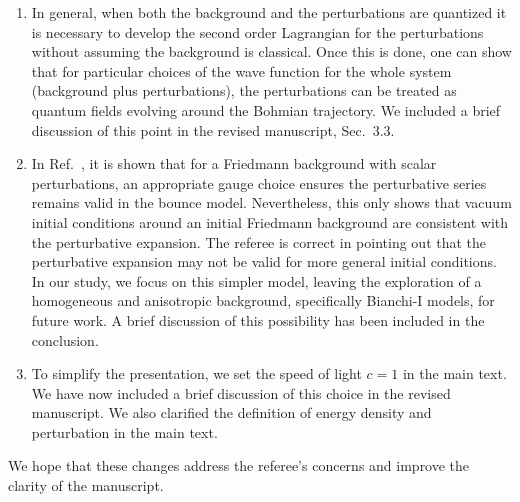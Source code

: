 \documentclass[a4paper,11pt]{article}
\begin{document}
\begin{enumerate}
\begin{enumerate}
            \end{enumerate}

      \item In general, when both the background and the perturbations are quantized it is necessary
            to develop the second order Lagrangian for the perturbations without assuming the background
            is classical. Once this is done, one can show that for particular choices of the wave function
            for the whole system (background plus perturbations), the perturbations can be treated as
            quantum fields evolving around the Bohmian trajectory. We included a brief discussion of this
            point in the revised manuscript, Sec.~3.3.

      \item In Ref.~\cite{vitenti2012large}, it is shown that for a Friedmann background with
            scalar perturbations, an appropriate gauge choice ensures the perturbative
            series remains valid in the bounce model. Nevertheless, this only shows that
            vacuum initial conditions around an initial Friedmann background are
            consistent with the perturbative expansion. The referee is correct in pointing
            out that the perturbative expansion may not be valid for more general initial
            conditions. In our study, we focus on this simpler model, leaving the
            exploration of a homogeneous and anisotropic background, specifically
            Bianchi-I models, for future work. A brief discussion of this possibility has
            been included in the conclusion.

      \item To simplify the presentation, we set the speed of light $c=1$ in the main
            text. We have now included a brief discussion of this choice in the revised
            manuscript. We also clarified the definition of energy density and perturbation
            in the main text.
\end{enumerate}

We hope that these changes address the referee's concerns and improve the clarity of
the manuscript.



\end{document}
